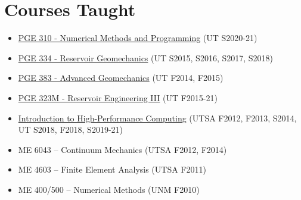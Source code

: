 \section*{Courses Taught}

  \begin{itemize}
      \item \href{https://johnfoster.pge.utexas.edu/PGE310-IntroProgramming/}{PGE 310 - Numerical Methods and Programming} (UT S2020-21)
      \item \href{http://johnfoster.pge.utexas.edu/PGE334-ResGeomechanics/}{PGE 334 - Reservoir Geomechanics} (UT S2015, S2016, S2017, S2018)
      \item \href{http://johnfoster.pge.utexas.edu/PGE383-AdvGeomechanics/}{PGE 383 - Advanced Geomechanics} (UT F2014, F2015)
      \item \href{http://johnfoster.pge.utexas.edu/PGE323M-ResEngineeringIII/}{PGE 323M - Reservoir Engineering III} (UT F2015-21)
      \item \href{http://johnfoster.pge.utexas.edu/HPC/}{Introduction to High-Performance Computing} (UTSA F2012, F2013, S2014, UT S2018, F2018, S2019-21)
      \item ME 6043 -- Continuum Mechanics (UTSA F2012, F2014)
      \item ME 4603 -- Finite Element Analysis (UTSA F2011)
      \item ME 400/500 -- Numerical Methods (UNM F2010)
  \end{itemize}
